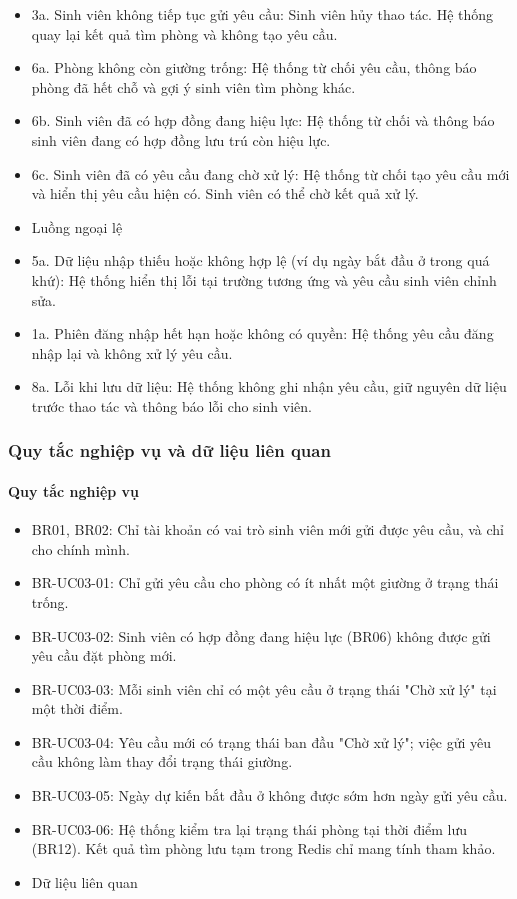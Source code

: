 \begin{itemize}[leftmargin=1.4em]
\item 3a. Sinh viên không tiếp tục gửi yêu cầu: Sinh viên hủy thao tác. Hệ thống quay lại kết quả tìm phòng và không tạo yêu cầu.
\item 6a. Phòng không còn giường trống: Hệ thống từ chối yêu cầu, thông báo phòng đã hết chỗ và gợi ý sinh viên tìm phòng khác.
\item 6b. Sinh viên đã có hợp đồng đang hiệu lực: Hệ thống từ chối và thông báo sinh viên đang có hợp đồng lưu trú còn hiệu lực.
\item 6c. Sinh viên đã có yêu cầu đang chờ xử lý: Hệ thống từ chối tạo yêu cầu mới và hiển thị yêu cầu hiện có. Sinh viên có thể chờ kết quả xử lý.
\item Luồng ngoại lệ
\item 5a. Dữ liệu nhập thiếu hoặc không hợp lệ (ví dụ ngày bắt đầu ở trong quá khứ): Hệ thống hiển thị lỗi tại trường tương ứng và yêu cầu sinh viên chỉnh sửa.
\item 1a. Phiên đăng nhập hết hạn hoặc không có quyền: Hệ thống yêu cầu đăng nhập lại và không xử lý yêu cầu.
\item 8a. Lỗi khi lưu dữ liệu: Hệ thống không ghi nhận yêu cầu, giữ nguyên dữ liệu trước thao tác và thông báo lỗi cho sinh viên.
\end{itemize}

\subsubsection{Quy tắc nghiệp vụ và dữ liệu liên quan}

\paragraph{Quy tắc nghiệp vụ}

\begin{itemize}[leftmargin=1.4em]
\item BR01, BR02: Chỉ tài khoản có vai trò sinh viên mới gửi được yêu cầu, và chỉ cho chính mình.
\item BR-UC03-01: Chỉ gửi yêu cầu cho phòng có ít nhất một giường ở trạng thái trống.
\item BR-UC03-02: Sinh viên có hợp đồng đang hiệu lực (BR06) không được gửi yêu cầu đặt phòng mới.
\item BR-UC03-03: Mỗi sinh viên chỉ có một yêu cầu ở trạng thái "Chờ xử lý" tại một thời điểm.
\item BR-UC03-04: Yêu cầu mới có trạng thái ban đầu "Chờ xử lý"; việc gửi yêu cầu không làm thay đổi trạng thái giường.
\item BR-UC03-05: Ngày dự kiến bắt đầu ở không được sớm hơn ngày gửi yêu cầu.
\item BR-UC03-06: Hệ thống kiểm tra lại trạng thái phòng tại thời điểm lưu (BR12). Kết quả tìm phòng lưu tạm trong Redis chỉ mang tính tham khảo.
\item Dữ liệu liên quan
\end{itemize}

